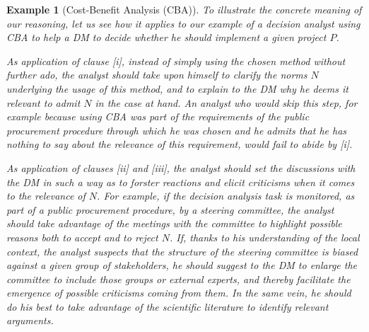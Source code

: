 \documentclass[preprint, french, english, 11pt, authoryear]{elsarticle}%
\newtheorem{example}{Example}
\begin{document}
\begin{example}[Cost-Benefit Analysis (CBA)]
To illustrate the concrete meaning of our reasoning, let us see how it applies to our example of a decision analyst using CBA to help a \ac{DM} to decide whether he should implement a given project $P$.

As application of clause [i], instead of simply using the chosen method without further ado, the analyst should take upon himself to clarify the norms $N$ underlying the usage of this method, and to explain to the \ac{DM} why he deems it relevant to admit $N$ in the case at hand. An analyst who would skip this step, for example because using CBA was part of the requirements of the public procurement procedure through which he was chosen and he admits that he has nothing to say about the relevance of this requirement, would fail to abide by [i].

As application of clauses [ii] and [iii], the analyst should set the discussions with the \ac{DM} in such a way as to forster reactions and elicit criticisms when it comes to the relevance of $N$. For example, if the decision analysis task is monitored, as part of a public procurement procedure, by a steering committee, the analyst should take advantage of the meetings with the committee to highlight possible reasons both to accept and to reject $N$. If, thanks to his understanding of the local context, the analyst suspects that the structure of the steering committee is biased against a given group of stakeholders, he should suggest to the \ac{DM} to enlarge the committee to include those groups or external experts, and thereby facilitate the emergence of possible criticisms coming from them. In the same vein, he should do his best to take advantage of the scientific literature to identify relevant arguments.  




\end{example}
\end{document}
